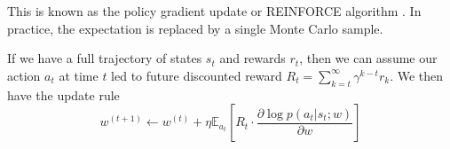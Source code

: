\documentclass[11pt]{report}
\begin{document}
This is known as the policy gradient update or REINFORCE algorithm \citep{williams1992reinforce}. In practice, the expectation is replaced by a single Monte Carlo sample. 

If we have a full trajectory of states $s_t$ and rewards $r_t$, then we can assume our action $a_t$ at time $t$ led to future discounted reward $R_t = \sum_{k=t}^\infty \gamma^{k-t} r_k$. We then have the update rule
\begin{equation}
w^{(t+1)} \gets w^{(t)} + \eta \mathbb{E}_{a_t} \left[ R_t \cdot \frac{\partial \log p(a_t | s_t ; w)}{\partial w}  \right]
\end{equation}

%
%

\end{document}
